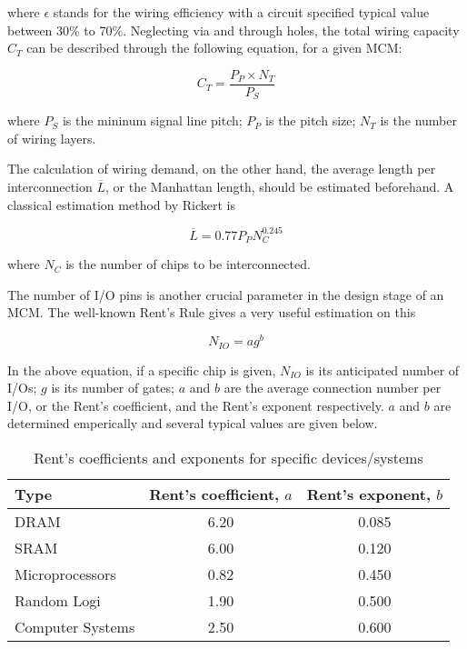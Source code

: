 \begin{spacing}{1.5}
where $\epsilon$ stands for the wiring efficiency with a circuit specified typical value between 30\% to 70\%. Neglecting via and through holes, the total wiring capacity $C_T$ can be described through the following equation, for a given MCM: 

\begin{equation}
    \label{eq.capacity}
    C_T=\frac{P_P\times N_T}{P_S}
\end{equation}

where $P_S$ is the mininum signal line pitch; $P_P$ is the pitch size; $N_T$ is the number of wiring layers. 

The calculation of wiring demand, on the other hand, the average length per interconnection $\overline{L}$, or the Manhattan length, should be estimated beforehand. A classical estimation method by Rickert is 

\begin{equation}
    \label{eq.rickert}
    \overline{L}=0.77P_PN_C^{0.245}
\end{equation}

where $N_C$ is the number of chips to be interconnected. \cite{rickert1989design} 

The number of I/O pins is another crucial parameter in the design stage of an MCM. The well-known Rent's Rule gives a very useful estimation on this 

\begin{equation}
    \label{eq.rent}
    N_{IO}=ag^b
\end{equation}

In the above equation, if a specific chip is given, $N_{IO}$ is its anticipated number of I/Os; $g$ is its number of gates; $a$ and $b$ are the average connection number per I/O, or the Rent's coefficient, and the Rent's exponent respectively. \cite{landman1971pin} $a$ and $b$ are determined emperically and several typical values are given below. \cite{tummala2001fundamentals}

\begin{table}[ht]
    \centering 
    \caption{Rent's coefficients and exponents for specific devices/systems} 
    \label{tb.rent} 
    \begin{tabular}[t]{lcc}
        \toprule 
        Type & Rent's coefficient, $a$ & Rent's exponent, $b$ \\ 
        \midrule 
        DRAM & 6.20 & 0.085 \\
        SRAM & 6.00 & 0.120 \\ 
        Microprocessors & 0.82 & 0.450 \\ 
        Random Logi & 1.90 & 0.500 \\
        Computer Systems & 2.50 & 0.600 \\ 
        \bottomrule
    \end{tabular}
\end{table}


\end{spacing}
